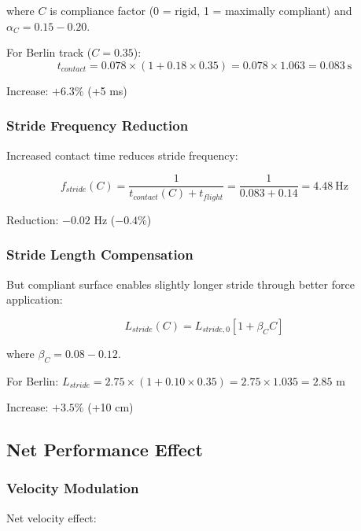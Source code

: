 where $C$ is compliance factor (0 = rigid, 1 = maximally compliant) and $\alpha_C = 0.15-0.20$.

For Berlin track ($C = 0.35$):
\begin{equation}
t_{contact} = 0.078 \times (1 + 0.18 \times 0.35) = 0.078 \times 1.063 = 0.083~\text{s}
\label{eq:berlin_contact_time}
\end{equation}

Increase: $+6.3\%$ (+5 ms)

\subsubsection{Stride Frequency Reduction}

Increased contact time reduces stride frequency:

\begin{equation}
f_{stride}(C) = \frac{1}{t_{contact}(C) + t_{flight}} = \frac{1}{0.083 + 0.14} = 4.48~\text{Hz}
\label{eq:stride_frequency_compliance}
\end{equation}

Reduction: $-0.02$ Hz ($-0.4\%$)

\subsubsection{Stride Length Compensation}

But compliant surface enables slightly longer stride through better force application:

\begin{equation}
L_{stride}(C) = L_{stride,0} [1 + \beta_C C]
\label{eq:stride_length_compliance}
\end{equation}

where $\beta_C = 0.08-0.12$.

For Berlin: $L_{stride} = 2.75 \times (1 + 0.10 \times 0.35) = 2.75 \times 1.035 = 2.85$ m

Increase: $+3.5\%$ (+10 cm)

\subsection{Net Performance Effect}

\subsubsection{Velocity Modulation}

Net velocity effect:

